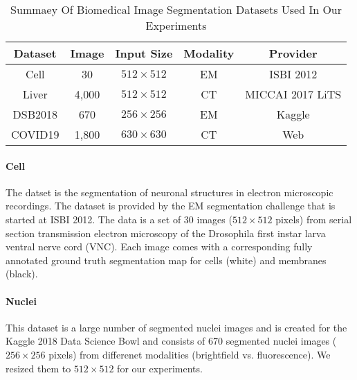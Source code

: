 \documentclass[UTF8]{article} %
\begin{document}
\begin{table}[ht]
  \vspace{-2mm}
  \begin{center}\small
  \caption{Summaey Of Biomedical Image Segmentation Datasets Used In Our Experiments}
  \label{dataset-table}
  \begin{tabular}{ccccc}
    
  \toprule
  Dataset & Image & Input Size & Modality & Provider\\
  \midrule
  Cell & 30 & $512\times 512$  & EM      & ISBI 2012\cite{isbicell}   \\
  Liver    & 4,000 & $512\times 512$       & CT     & MICCAI 2017 LiTS\cite{liver}  \\
  DSB2018      & 670 & $256\times 256$      & EM      & Kaggle\cite{dsb2018} \\
  COVID19         & 1,800 & $630\times 630$     & CT     & Web\cite{covid19,covid19_2}  \\
\bottomrule    
  \end{tabular}
  \end{center}
  \vspace{-4mm}
  \end{table}

\paragraph{Cell}
The datset is the segmentation of neuronal structures in electron microscopic recordings.
The dataset is provided by the EM segmentation challenge\cite{isbicell} that is started at ISBI 2012.
The data is a set of 30 images ($512\times 512$ pixels) from serial section transmission electron
microscopy of the Drosophila first instar larva ventral nerve cord (VNC). Each image comes with a corresponding fully annotated ground truth segmentation
map for cells (white) and membranes (black).

\paragraph{Nuclei}
This dataset is a large number of segmented nuclei images\cite{dsb2018}
and is created for the Kaggle 2018 Data Science Bowl and consists of 670 segmented nuclei images
(\(256 \times 256\) pixels) from differenet modalities (brightfield vs. fluorescence). 
We resized them to \(512 \times 512\) for our experiments.

\end{document}
